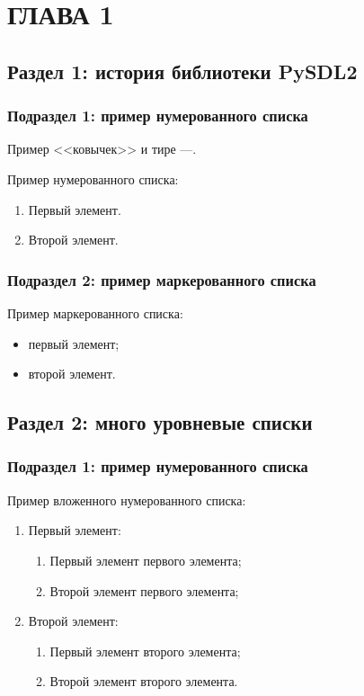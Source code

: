 \chapter{\label{ch:ch01}ГЛАВА 1} %

\section{\label{sec:ch01/sec01}Раздел 1: история библиотеки PySDL2}

\subsection{\label{subsec:ch01/sec01/sub01}Подраздел 1: пример нумерованного списка}

Пример <<ковычек>> и тире ---.

Пример нумерованного списка:
\begin{enumerate}
\item Первый элемент.
\item Второй элемент.
\end{enumerate}

\subsection{\label{subsec:ch01/sec01/sub02}Подраздел 2: пример маркерованного списка}

Пример маркерованного списка:
\begin{itemize}
\item первый элемент;
\item второй элемент.
\end{itemize}

\section{\label{sec:ch01/sec02}Раздел 2: много уровневые списки}

\subsection{\label{subsec:ch01/sec02/sub01}Подраздел 1: пример нумерованного списка}

Пример вложенного нумерованного списка:
\begin{enumerate}
\item Первый элемент:
\begin{enumerate}
\item Первый элемент первого элемента;
\item Второй элемент первого элемента;
\end{enumerate}
\item Второй элемент:
\begin{enumerate}
\item Первый элемент второго элемента;
\item Второй элемент второго элемента.
\end{enumerate}
\end{enumerate}

